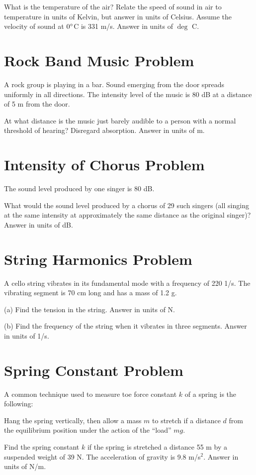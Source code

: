\documentclass[../physics12.tex]{subfiles}
\begin{document}
What is the temperature of the air? Relate the speed of sound in air to temperature in units of Kelvin, but answer in units of Celsius. Assume the velocity of sound at $0\degree$C is 331 m/s. Answer in units of $\deg$ C.

\section{Rock Band Music Problem}
A rock group is playing in a bar. Sound emerging from the door spreads uniformly in all directions.
The intensity level of the music is 80 dB at a distance of 5 m from the door.

At what distance is the music just barely audible to a person with a normal threshold of hearing? Disregard absorption. Answer in units of m.

\section{Intensity of Chorus Problem}
The sound level produced by one singer is 80 dB. 

What would the sound level produced by a chorus of 29 such singers (all singing at the same intensity at approximately the same distance as the original singer)? Answer in units of dB.

\section{String Harmonics Problem}
A cello string vibrates in its fundamental mode with a frequency of 220 1/s. The vibrating segment is 70 cm long and has a mass of 1.2 g.

(a) Find the tension in the string. Answer in units of N.

(b) Find the frequency of the string when it vibrates in three segments. Answer in units of 1/s.

\section{Spring Constant Problem}
A common technique used to measure toe force constant $k$ of a spring is the following:

Hang the spring vertically, then allow a mass $m$ to stretch if a distance $d$ from the equilibrium position under the action of the ``load'' $mg$.

Find the spring constant $k$ if the spring is stretched a distance 55 m by a suspended weight of 39 N. The acceleration of gravity is 9.8 m/s$^2$. Answer in units of N/m.
\end{document}

